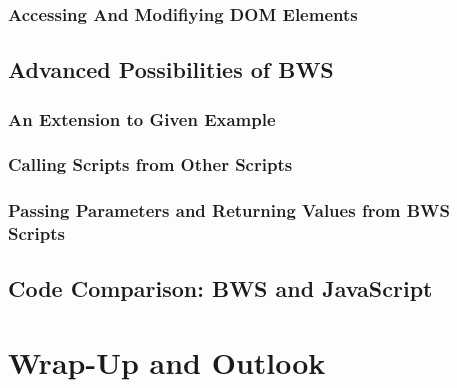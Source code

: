   

  \subsubsection{Accessing And Modifiying DOM Elements}
  
  
  
 \subsection{Advanced Possibilities of BWS}
  \subsubsection{An Extension to Given Example}
  \subsubsection{Calling Scripts from Other Scripts}
  \subsubsection{Passing Parameters and Returning Values from BWS Scripts}
 \subsection{Code Comparison: BWS and JavaScript}
\section{Wrap-Up and Outlook}